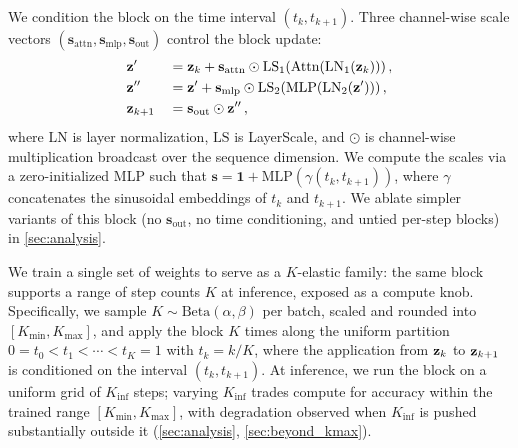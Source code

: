We condition the block on the time interval $(t_k, t_{k+1})$.
Three channel-wise scale vectors $(\mathbf{s}_\text{attn}, \mathbf{s}_\text{mlp}, \mathbf{s}_\text{out})$ control the block update:
\begin{equation}
\begin{aligned}
    & \mathbf{z}' && = \mathbf{z}_k + \mathbf{s}_\text{attn} \odot \text{LS}_1(\text{Attn}(\text{LN}_1(\mathbf{z}_k)))\,, \\
    & \mathbf{z}'' && = \mathbf{z}' + \mathbf{s}_\text{mlp} \odot \text{LS}_2(\text{MLP}(\text{LN}_2(\mathbf{z}')))\,, \\
    & \mathbf{z}_{k+1} && = \mathbf{s}_\text{out} \odot \mathbf{z}''\,,
\end{aligned}
\label{eq:gated_block}
\end{equation}
where $\text{LN}$ is layer normalization, $\text{LS}$ is LayerScale, and $\odot$ is channel-wise multiplication broadcast over the sequence dimension.
We compute the scales via a zero-initialized MLP such that $\mathbf{s} = \mathbf{1} + \text{MLP}(\gamma(t_k, t_{k+1}))$, where $\gamma$ concatenates the sinusoidal embeddings of $t_k$ and $t_{k+1}$.
We ablate simpler variants of this block (no $\mathbf{s}_\text{out}$, no time conditioning, and untied per-step blocks) in \cref{sec:analysis}.



We train a single set of weights to serve as a 
$K$-elastic
family: the same block supports a range of step counts $K$ at inference, exposed as a compute knob.
Specifically, we sample $K \sim \text{Beta}(\alpha, \beta)$ per batch, scaled and rounded into $[K_\text{min}, K_\text{max}]$, and apply the block $K$ times along the uniform partition $0 = t_0 < t_1 < \cdots < t_K = 1$ with $t_k = k/K$,
where the application from $\mathbf{z}_k$ to $\mathbf{z}_{k+1}$ is conditioned on the interval $(t_k, t_{k+1})$.
At inference, we run the block on a uniform grid of $K_\text{inf}$ steps; varying $K_\text{inf}$ trades compute for accuracy within the trained range $[K_\text{min}, K_\text{max}]$, with degradation observed when $K_\text{inf}$ is pushed substantially outside it (\cref{sec:analysis}, \cref{sec:beyond_kmax}).


